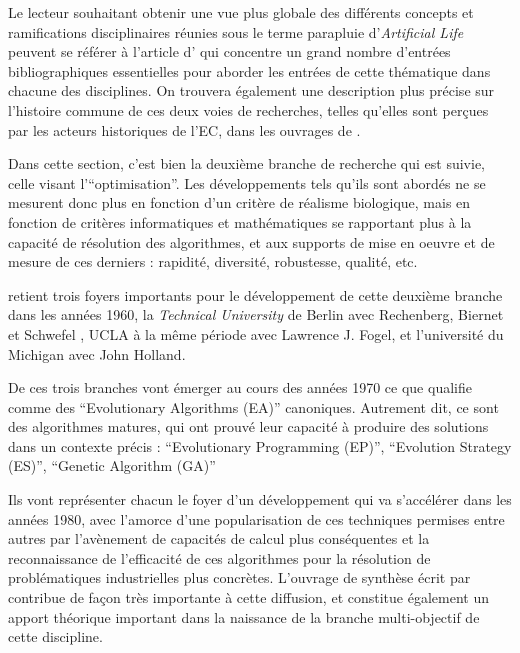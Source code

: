 Le lecteur souhaitant obtenir une vue plus globale des différents concepts et ramifications disciplinaires réunies sous le terme parapluie d'\textit{Artificial Life} peuvent se référer à l'article d'\textcite{Aguilar2014} qui concentre un grand nombre d'entrées bibliographiques essentielles pour aborder les entrées de cette thématique dans chacune des disciplines. On trouvera également une description plus précise sur l'histoire commune de ces deux voies de recherches, telles qu'elles sont perçues par les acteurs historiques de l'EC, dans les ouvrages de \autocites{DeJong2006a, Fogel1998, Fogel2006a, Fogel2006b, Back1996, Back1997}.

Dans cette section, c'est bien la deuxième branche de recherche qui est suivie, celle visant l'\enquote{optimisation}. Les développements tels qu'ils sont abordés ne se mesurent donc plus en fonction d'un critère de réalisme biologique, mais en fonction de critères informatiques et mathématiques se rapportant plus à la capacité de résolution des algorithmes, et aux supports de mise en oeuvre et de mesure de ces derniers : rapidité, diversité, robustesse, qualité, etc.

\textcite{DeJong2006a} retient trois foyers importants pour le développement de cette deuxième branche dans les années 1960, la \textit{Technical University} de Berlin avec Rechenberg, Biernet et Schwefel \autocite{Beyer2002}, UCLA à la même période avec Lawrence J. Fogel, et l'université du Michigan avec John Holland.

De ces trois branches vont émerger au cours des années 1970 ce que \textcite{DeJong2006a} qualifie comme des \foreignquote{english}{Evolutionary Algorithms (EA)} canoniques. Autrement dit, ce sont des algorithmes matures, qui ont prouvé leur capacité à produire des solutions dans un contexte précis : \foreignquote{english}{Evolutionary Programming (EP)}, \foreignquote{english}{Evolution Strategy (ES)}, \foreignquote{english}{Genetic Algorithm (GA)}

Ils vont représenter chacun le foyer d'un développement qui va s'accélérer dans les années 1980, avec l'amorce d'une popularisation de ces techniques permises entre autres par l'avènement de capacités de calcul plus conséquentes et la reconnaissance de l'efficacité de ces algorithmes pour la résolution de problématiques industrielles plus concrètes. L'ouvrage de synthèse écrit par \textcite{Goldberg1989} contribue de façon très importante à cette diffusion, et constitue également un apport théorique important dans la naissance de la branche multi-objectif de cette discipline.

